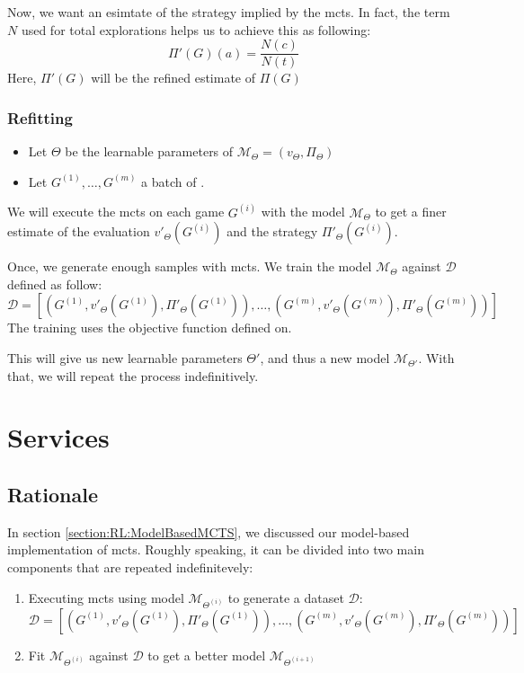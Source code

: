 Now, we want an esimtate of the strategy implied by the \acrshort{mcts}. In fact, the  term $N$ used for total explorations helps us to achieve this as following:
\begin{equation}
	\Pi'(G)(a) = \frac{N(c)}{N(t)} 
\end{equation}
Here, $\Pi'(G)$ will be the refined estimate of $\Pi(G)$

\subsubsection{Refitting}
\begin{itemize}
	\item Let $\Theta$ be the learnable parameters of $\mathcal{M}_\Theta=(v_{\Theta},\Pi_{\Theta})$
	\item Let $G^{(1)},\dots,G^{(m)}$ a batch of .
\end{itemize}
We will execute the \acrshort{mcts} on each game $G^{(i)}$ with the model $\mathcal{M}_{\Theta}$ to get a finer estimate of the evaluation $v'_{\Theta}(G^{(i)})$ and the strategy $\Pi'_{\Theta}(G^{(i)}).$

Once, we generate enough samples with \acrshort{mcts}. We train the model $\mathcal{M}_{\Theta}$ against $\mathscr{D}$ defined as follow:
$$
\mathscr{D}=\left[\left(G^{(1)},v'_{\Theta}(G^{(1)}),\Pi'_{\Theta}(G^{(1)})\right), \dots,\left(G^{(m)},v'_{\Theta}(G^{(m)}),\Pi'_{\Theta}(G^{(m)})\right)\right]
$$ 
The training uses the objective function defined on.

This will give us new learnable parameters $\Theta'$, and thus a new model $\mathcal{M}_{\Theta'}.$ With that, we will repeat the process indefinitively.


\section{Services}
\subsection{Rationale}
In section \ref{section:RL:ModelBasedMCTS}, we discussed our model-based implementation of \acrshort{mcts}. Roughly speaking, it can be divided into two main components that are repeated indefinitevely:
\begin{enumerate}
	\item Executing \acrshort{mcts} using model $\mathcal{M}_{\Theta^{(i)}}$ to generate a dataset $\mathcal{D}$: $$
	\mathscr{D}=\left[\left(G^{(1)},v'_{\Theta}(G^{(1)}),\Pi'_{\Theta}(G^{(1)})\right), \dots,\left(G^{(m)},v'_{\Theta}(G^{(m)}),\Pi'_{\Theta}(G^{(m)})\right)\right]
	$$
	\item Fit $\mathcal{M}_{\Theta^{(i)}}$ against $\mathscr{D}$ to get a better model $\mathcal{M}_{\Theta^{(i+1)}}$
\end{enumerate}

